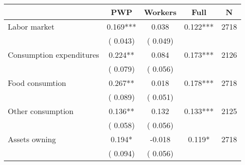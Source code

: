 
\begin{tabular}{l*{4}{c}}\hline&\multicolumn{1}{c}{PWP}&\multicolumn{1}{c}{Workers}&\multicolumn{1}{c}{Full}&\multicolumn{1}{c}{N} \\ \hline

 Labor market                       &              0.169*** &         0.038            &              0.122***     & 2718                             \\  
                                       &          (       0.043)               &        (       0.049)                                &                                               &                                               \\      

 Consumption expenditures                       &              0.224** &         0.084            &              0.173***     & 2126                             \\  
                                       &          (       0.079)               &        (       0.056)                                &                                               &                                               \\      

 Food consumtion                       &              0.267** &         0.018            &              0.178***     & 2718                             \\  
                                       &          (       0.089)               &        (       0.051)                                &                                               &                                               \\      

 Other consumption                       &              0.136** &         0.132            &              0.133***     & 2125                             \\  
                                       &          (       0.058)               &        (       0.056)                                &                                               &                                               \\      

 Assets owning                       &              0.194* &        -0.018            &              0.119*     & 2718                             \\  
                                       &          (       0.094)               &        (       0.056)                                &                                               &                                               \\      


\end{tabular}
